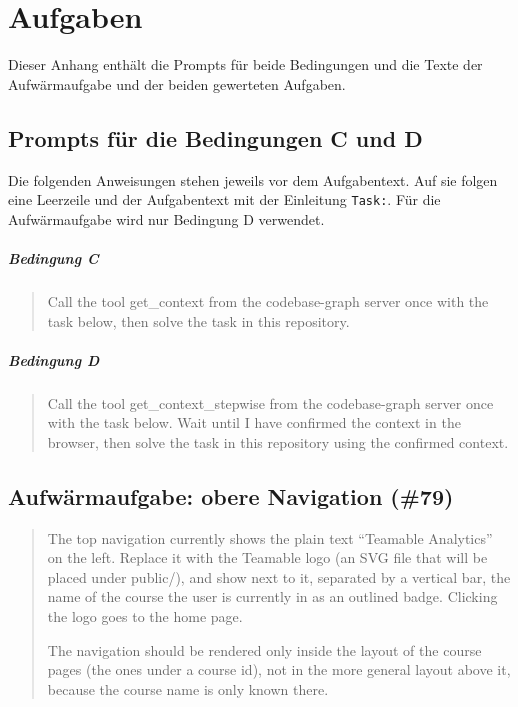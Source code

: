 
\chapter{Aufgaben}
\label{app:aufgaben}

Dieser Anhang enthält die Prompts für beide Bedingungen und die Texte der Aufwärmaufgabe und der beiden gewerteten Aufgaben.

\section{Prompts für die Bedingungen C und D}
\label{app:prompts}

Die folgenden Anweisungen stehen jeweils vor dem Aufgabentext. Auf sie folgen eine Leerzeile und der Aufgabentext mit der Einleitung \texttt{Task:}. Für die Aufwärmaufgabe wird nur Bedingung D verwendet.

\paragraph{Bedingung C}
\begin{quote}
Call the tool get\_context from the codebase-graph server once with the task below, then solve the task in this repository.
\end{quote}

\paragraph{Bedingung D}
\begin{quote}
Call the tool get\_context\_stepwise from the codebase-graph server once with the task below. Wait until I have confirmed the context in the browser, then solve the task in this repository using the confirmed context.
\end{quote}

\section{Aufwärmaufgabe: obere Navigation (\#79)}

\begin{quote}
The top navigation currently shows the plain text ``Teamable Analytics'' on the left. Replace it with the Teamable logo (an SVG file that will be placed under public/), and show next to it, separated by a vertical bar, the name of the course the user is currently in as an outlined badge. Clicking the logo goes to the home page.

The navigation should be rendered only inside the layout of the course pages (the ones under a course id), not in the more general layout above it, because the course name is only known there.
\end{quote}

